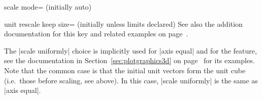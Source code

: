 \begin{pgfplotskey}{scale mode= (initially auto)}
\begin{pgfplotskey}{unit rescale keep size= (initially unless limits declared)}
		See also the addition documentation for this key and related examples on page~\pageref{key:unit:rescale:keep:size}.
	\end{pgfplotskey}

	The |scale uniformly| choice is implicitly used for |axis equal| and for the  feature, see the documentation in Section~\ref{sec:plotgraphics3d} on page~\pageref{sec:plotgraphics3d} for its examples. Note that the common case is that the initial unit vectors form the unit cube (i.e.\ those before scaling, see above). In this case, |scale uniformly| is the same as |axis equal|.
\end{pgfplotskey}

